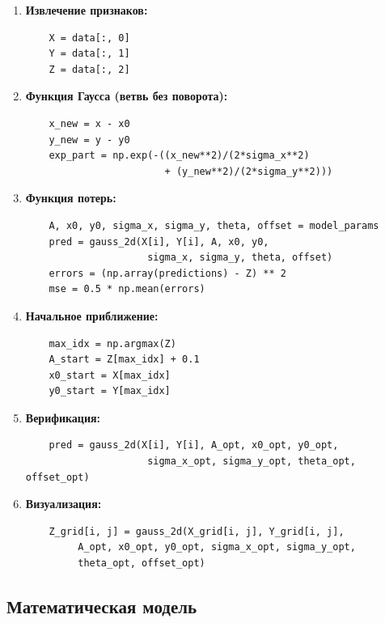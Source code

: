 \begin{enumerate}
    \item \textbf{Извлечение признаков:}
    \begin{verbatim}
    X = data[:, 0]
    Y = data[:, 1]
    Z = data[:, 2]
    \end{verbatim}

    \item \textbf{Функция Гаусса (ветвь без поворота):}
    \begin{verbatim}
    x_new = x - x0
    y_new = y - y0
    exp_part = np.exp(-((x_new**2)/(2*sigma_x**2)
                        + (y_new**2)/(2*sigma_y**2)))
    \end{verbatim}

    \item \textbf{Функция потерь:}
    \begin{verbatim}
    A, x0, y0, sigma_x, sigma_y, theta, offset = model_params
    pred = gauss_2d(X[i], Y[i], A, x0, y0,
                     sigma_x, sigma_y, theta, offset)
    errors = (np.array(predictions) - Z) ** 2
    mse = 0.5 * np.mean(errors)
    \end{verbatim}

    \item \textbf{Начальное приближение:}
    \begin{verbatim}
    max_idx = np.argmax(Z)
    A_start = Z[max_idx] + 0.1
    x0_start = X[max_idx]
    y0_start = Y[max_idx]
    \end{verbatim}

    \item \textbf{Верификация:}
    \begin{verbatim}
    pred = gauss_2d(X[i], Y[i], A_opt, x0_opt, y0_opt,
                     sigma_x_opt, sigma_y_opt, theta_opt, offset_opt)
    \end{verbatim}

    \item \textbf{Визуализация:}
    \begin{verbatim}
    Z_grid[i, j] = gauss_2d(X_grid[i, j], Y_grid[i, j],
         A_opt, x0_opt, y0_opt, sigma_x_opt, sigma_y_opt,
         theta_opt, offset_opt)
    \end{verbatim}
\end{enumerate}

\subsection{Математическая модель}


